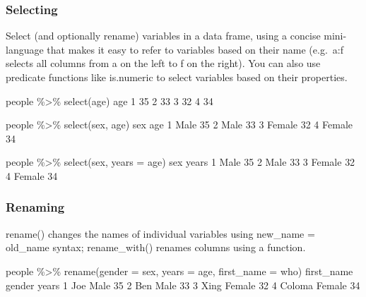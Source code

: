 \documentclass[
]{book}
\newenvironment{Shaded}{\begin{snugshade}}{\end{snugshade}}
\newcommand{\AttributeTok}[1]{\textcolor[rgb]{0.77,0.63,0.00}{#1}}
\newcommand{\DecValTok}[1]{\textcolor[rgb]{0.00,0.00,0.81}{#1}}
\newcommand{\FunctionTok}[1]{\textcolor[rgb]{0.00,0.00,0.00}{#1}}
\newcommand{\NormalTok}[1]{#1}
\newcommand{\SpecialCharTok}[1]{\textcolor[rgb]{0.00,0.00,0.00}{#1}}
\begin{document}
\hypertarget{selecting}{%
\subsubsection*{Selecting}\label{selecting}}

Select (and optionally rename) variables in a data frame, using a concise mini-language that makes it easy to refer to variables based on their name (e.g.~a:f selects all columns from a on the left to f on the right). You can also use predicate functions like is.numeric to select variables based on their properties.

\begin{Shaded}
\begin{Highlighting}[]
\NormalTok{people }\SpecialCharTok{\%\textgreater{}\%} \FunctionTok{select}\NormalTok{(age)}
\NormalTok{  age}
\DecValTok{1}  \DecValTok{35}
\DecValTok{2}  \DecValTok{33}
\DecValTok{3}  \DecValTok{32}
\DecValTok{4}  \DecValTok{34}

\NormalTok{people }\SpecialCharTok{\%\textgreater{}\%} \FunctionTok{select}\NormalTok{(sex, age)}
\NormalTok{     sex age}
\DecValTok{1}\NormalTok{   Male  }\DecValTok{35}
\DecValTok{2}\NormalTok{   Male  }\DecValTok{33}
\DecValTok{3}\NormalTok{ Female  }\DecValTok{32}
\DecValTok{4}\NormalTok{ Female  }\DecValTok{34}

\NormalTok{people }\SpecialCharTok{\%\textgreater{}\%} \FunctionTok{select}\NormalTok{(sex, }\AttributeTok{years =}\NormalTok{ age)}
\NormalTok{     sex years}
\DecValTok{1}\NormalTok{   Male    }\DecValTok{35}
\DecValTok{2}\NormalTok{   Male    }\DecValTok{33}
\DecValTok{3}\NormalTok{ Female    }\DecValTok{32}
\DecValTok{4}\NormalTok{ Female    }\DecValTok{34}
\end{Highlighting}
\end{Shaded}

\hypertarget{renaming}{%
\subsubsection*{Renaming}\label{renaming}}

rename() changes the names of individual variables using new\_name = old\_name syntax; rename\_with() renames columns using a function.

\begin{Shaded}
\begin{Highlighting}[]
\NormalTok{people }\SpecialCharTok{\%\textgreater{}\%} \FunctionTok{rename}\NormalTok{(}\AttributeTok{gender =}\NormalTok{ sex, }\AttributeTok{years =}\NormalTok{ age, }\AttributeTok{first\_name =}\NormalTok{ who)}
\NormalTok{  first\_name gender years}
\DecValTok{1}\NormalTok{        Joe   Male    }\DecValTok{35}
\DecValTok{2}\NormalTok{        Ben   Male    }\DecValTok{33}
\DecValTok{3}\NormalTok{       Xing Female    }\DecValTok{32}
\DecValTok{4}\NormalTok{     Coloma Female    }\DecValTok{34}
\end{Highlighting}
\end{Shaded}
\end{document}
